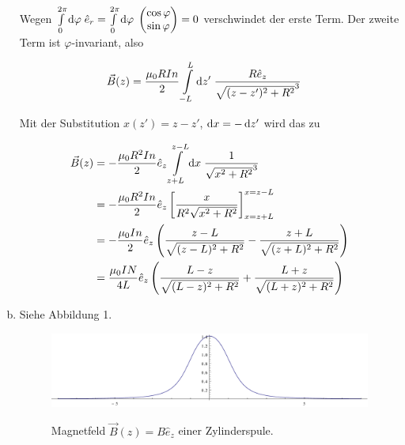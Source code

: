 \documentclass[a4paper,german,12pt,smallheadings]{scrartcl}
\begin{document}
\begin{enumerate}[a)]
Wegen $
  \int\limits_0^{2 \pi} \dif \varphi \; \hat{e}_r =
  \int\limits_0^{2 \pi} \dif \varphi \; \begin{pmatrix}
    \cos \varphi \\
    \sin \varphi \\
  \end{pmatrix}
  = 0
$
verschwindet der erste Term. Der zweite Term ist $\varphi$-invariant, also

\begin{align*}
  \vec{B}(z)
  &= \frac{\mu_0 R I n}{2}
  \int\limits_{-L}^{L} \dif z' \;
  \frac{
    R \hat{e}_z
  }{
    \sqrt{(z-z')^2 + R^2}^3
  }
\end{align*}

Mit der Substitution $x(z') = z - z'$, $\dif x = - \dif z'$ wird das zu

\begin{align*}
  \vec{B}(z)
  &= -\frac{\mu_0 R^2 I n}{2} \hat{e}_z
  \int\limits_{z+L}^{z-L} \dif x \;
  \frac{
    1
  }{
    \sqrt{x^2 + R^2}^3
  } \\
  &= -\frac{\mu_0 R^2 I n}{2} \hat{e}_z
  \sbr[3]{
    \frac{x}{R^2 \sqrt{x^2 + R^2}}
  }_{x=z+L}^{x=z-L} \\
  &= -\frac{\mu_0 I n}{2} \hat{e}_z
  \del{
    \frac{z-L}{\sqrt{(z-L)^2 + R^2}}
    -\frac{z+L}{\sqrt{(z+L)^2 + R^2}}
  } \\
  &= \frac{\mu_0 I N}{4L} \hat{e}_z
  \del{
    \frac{L-z}{\sqrt{(L-z)^2 + R^2}}
    +\frac{L+z}{\sqrt{(L+z)^2 + R^2}}
  }
\end{align*}
\item Siehe Abbildung 1.
  \begin{figure}[h!]
    \includegraphics[width=\textwidth]{plot-zylinderspule.pdf}
    \label{zylinderspule}
    \caption{Magnetfeld $\vec{B}(z) = B \hat{e}_z$ einer Zylinderspule.}
  \end{figure}


\end{enumerate}
\end{document}
